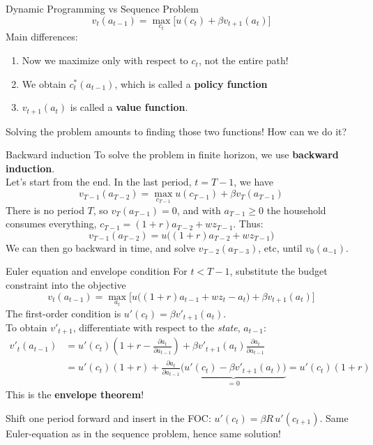 \documentclass[
  10pt,
  ignorenonframetext,
  aspectratio=43,
  english,
  handout]{beamer}
\providecommand{\tightlist}{%
  \setlength{\itemsep}{0pt}\setlength{\parskip}{0pt}}
\begin{document}
\begin{frame}{Dynamic Programming vs Sequence Problem}
\protect{}\label{dynamic-programming-vs-sequence-problem}
\[
v_{t}(a_{t-1})=\max_{c_{t}} \Big[ u(c_{t})+\beta v_{t+1}(a_{t})\Big]
\] Main differences:

\vspace{5mm}

\begin{enumerate}
\tightlist
\item
  Now we maximize only with respect to \(c_t\), not the entire path!
\item
  We obtain \(c^{\ast}_t(a_{t-1})\), which is called a \textbf{policy
  function}
\item
  \(v_{t+1}(a_t)\) is called a \textbf{value function}.
\end{enumerate}

\vspace{5mm}

Solving the problem amounts to finding those two functions! How can we
do it?
\end{frame}

\begin{frame}{Backward induction}
\protect{}\label{backward-induction}
To solve the problem in finite horizon, we use \textbf{backward
induction}.\\
Let's start from the end. In the last period, \(t=T-1\), we have \[
v_{T-1}(a_{T-2})=\max_{c_{T-1}} u(c_{T-1}) + \beta v_{T}(a_{T-1})
\] There is no period \(T\), so \(v_{T}(a_{T-1})=0\), and with \(a_{T-1}\geq0\) the household consumes everything, \(c_{T-1}=(1+r)a_{T-2}+wz_{T-1}\). Thus: \[
v_{T-1}(a_{T-2}) = u\big((1+r)a_{T-2}+wz_{T-1}\big)
\] We can then go backward in time, and solve \(v_{T-2}(a_{T-3})\), etc,
until \(v_0(a_{-1})\).
\end{frame}

\begin{frame}{Euler equation and envelope condition}
\protect{}\label{euler-equation-and-envelope-condition}
For \(t<T-1\), substitute the budget constraint into the objective \[
v_{t}(a_{t-1}) = \max_{a_{t}} \Big[u\big((1+r)a_{t-1}+wz_{t}-a_{t}\big)+\beta v_{t+1}(a_{t})\Big]
\]The first-order condition is \(u'(c_{t}) = \beta v'_{t+1}(a_{t})\). \\
To obtain \(v'_{t+1}\), differentiate with respect to the \emph{state}, \(a_{t-1}\): \[
\begin{aligned}
    v'_{t}(a_{t-1}) &= u'(c_{t}) \left(1+r-\frac{\partial a_{t}}{\partial a_{t-1}} \right) + \beta v'_{t+1}(a_{t}) \frac{\partial a_{t}}{\partial a_{t-1}}  \\
    &= u'(c_{t})(1+r) + \frac{\partial a_{t}}{\partial a_{t-1}} \underbrace{\Big(u'(c_{t}) -\beta v'_{t+1}(a_{t})\Big)}_{=0} = u'(c_{t})(1+r)
\end{aligned}
\] This is the \textbf{envelope theorem}!

Shift one period forward and insert in the FOC:
\(u'(c_{t})=\beta R\,u'(c_{t+1})\). Same Euler-equation as in the
sequence problem, hence same solution!
\end{frame}
\end{document}

